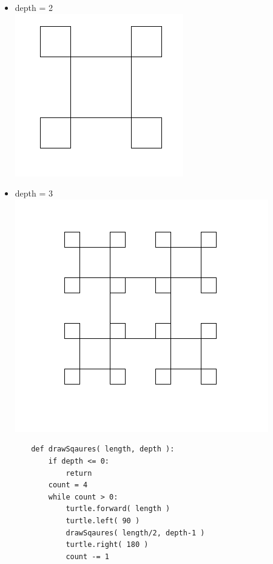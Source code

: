 \documentclass[11pt]{article}
\newenvironment{answer}{\large\lstset{basicstyle=\large}\color{white}}{}
\newenvironment{answer}{\large\lstset{basicstyle=\large}\color{red}}{}
\begin{document}
\begin{enumerate}
\begin{itemize}
            \item depth = 2 \\
            \includegraphics[scale=0.4]{2.png}
            \item depth = 3\\
            \includegraphics[scale=0.4]{3.png}
        \end{itemize}
    \begin{answer}
    \begin{lstlisting}
       def drawSqaures( length, depth ):
           if depth <= 0:
               return
           count = 4
           while count > 0:
               turtle.forward( length )
               turtle.left( 90 )
               drawSqaures( length/2, depth-1 )
               turtle.right( 180 )
               count -= 1
      \end{lstlisting}
     \end{answer}






\end{enumerate}
\end{document}
